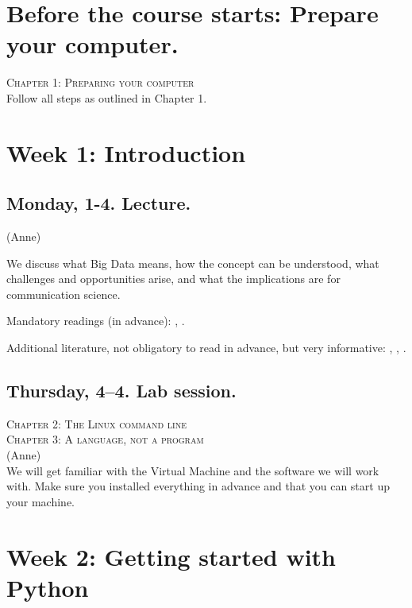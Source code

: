 \section*{Before the course starts: Prepare your computer.}
\textsc{ Chapter 1: Preparing your computer}\\
Follow all steps as outlined in Chapter 1.

\section*{Week 1: Introduction}
\subsection*{Monday, 1-4. Lecture.}
{\footnotesize{(Anne)}\\}

We discuss what Big Data means, how the concept can be understood, what challenges and opportunities arise, and what the implications are for communication science. 

Mandatory readings (in advance): \citealp{boyd2012}, \citealp{Kitchin2014}. 

Additional literature, not obligatory to read in advance, but very informative: \citealp{Mahrt2013}, \citealp{Vis2013}, \citealp{Trilling2017a}.



\subsection*{Thursday, 4--4. Lab session.}
\textsc{ Chapter 2: The Linux command line}\\
\textsc{ Chapter 3: A language, not a program}\\
{\footnotesize{(Anne)}\\}
We will get familiar with the Virtual Machine and the software we will work with. Make sure you installed everything in advance and that you can start up your machine. 


\section*{Week 2: Getting started with Python}

